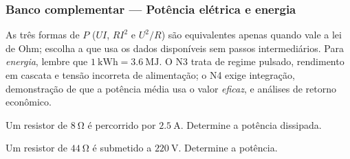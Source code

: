 
\subsubsection*{Banco complementar --- Potência elétrica e energia}

\begin{atencao}
As três formas de $P$ ($UI$, $RI^{2}$ e $U^{2}/R$) são equivalentes apenas
quando vale a lei de Ohm; escolha a que usa os dados disponíveis sem passos
intermediários. Para \emph{energia}, lembre que $\SI{1}{\kilo\watt\hour}
=\SI{3.6}{\mega\joule}$. O N3 trata de regime pulsado, rendimento em cascata e
tensão incorreta de alimentação; o N4 exige integração, demonstração de que a
potência média usa o valor \emph{eficaz}, e análises de retorno econômico.
\end{atencao}

\blocofixacao

\begin{questao}[1]{}
Um resistor de $\SI{8}{\ohm}$ é percorrido por $\SI{2.5}{\ampere}$. Determine a
potência dissipada.
\end{questao}

\begin{questao}[1]{}
Um resistor de $\SI{44}{\ohm}$ é submetido a $\SI{220}{\volt}$. Determine a
potência.
\end{questao}


